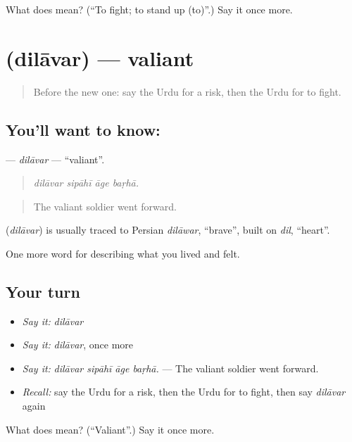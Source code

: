 \begin{tcolorbox}[breakable,colback=teal!4,colframe=teal!35!black,title={Before you move on}]
What does  mean? (\textquotedblleft{}To fight; to stand up (to)\textquotedblright{}.) Say it once more.
\end{tcolorbox}
\section[\texorpdfstring{\ur{دلاور} (dilāvar)}{دلاور (dilāvar)}]{ (dilāvar) — valiant}

\label{lesson:UR-C460-dilavar}



\begin{quote}
Before the new one: say the Urdu for a risk, then the Urdu for to fight.
\end{quote}

\subsection*{You'll want to know: }
\textbf{} — \emph{dilāvar} — \textquotedblleft{}valiant\textquotedblright{}.

\begin{quote}
   
\end{quote}

\begin{quote}
\emph{dilāvar sipāhī āge baṛhā.}
\end{quote}

\begin{quote}
The valiant soldier went forward.
\end{quote}

\begin{cousinweb}
\textbf{} (\emph{dilāvar}) is usually traced to Persian \emph{dilāwar}, \textquotedblleft{}brave\textquotedblright{}, built on \emph{dil}, \textquotedblleft{}heart\textquotedblright{}.
\end{cousinweb}

\begin{grammarlens}[title={What you've built}]
One more word for describing what you lived and felt.
\end{grammarlens}

\subsection*{Your turn}
\begin{itemize}
\raggedright
  \item \emph{Say it:} \emph{dilāvar}
  \item \emph{Say it:} \emph{dilāvar}, once more
  \item \emph{Say it:} \emph{dilāvar sipāhī āge baṛhā.} — The valiant soldier went forward.
  \item \emph{Recall:} say the Urdu for a risk, then the Urdu for to fight, then say \emph{dilāvar} again
\end{itemize}

\begin{tcolorbox}[breakable,colback=teal!4,colframe=teal!35!black,title={Before you move on}]
What does  mean? (\textquotedblleft{}Valiant\textquotedblright{}.) Say it once more.
\end{tcolorbox}
